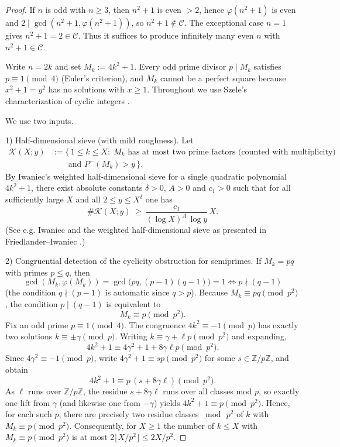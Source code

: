\documentclass[12pt]{article}
\theoremstyle{remark}
\begin{document}
\begin{proof}
If $n$ is odd with $n\ge 3$, then $n^2+1$ is even $>2$, hence $\varphi(n^2+1)$ is even and $2\mid\gcd(n^2+1,\varphi(n^2+1))$, so $n^2+1\notin\mathcal C$. The exceptional case $n=1$ gives $n^2+1=2\in\mathcal C$. Thus it suffices to produce infinitely many even $n$ with $n^2+1\in\mathcal C$.

Write $n=2k$ and set $M_k:=4k^2+1$. Every odd prime divisor $p\mid M_k$ satisfies $p\equiv1\pmod4$ (Euler's criterion), and $M_k$ cannot be a perfect square because $x^2+1=y^2$ has no solutions with $x\ge1$. Throughout we use Szele's characterization of cyclic integers \cite{Szele1947}.

We use two inputs.

1) Half-dimensional sieve (with mild roughness). Let
\[
\begin{aligned}
\mathcal K(X;y)
 &:= \{\,1\le k\le X:\; M_k \text{ has at most two prime factors (counted with multiplicity)}\\
 &\qquad \text{and } P^-(M_k)>y\,\}.
\end{aligned}
\]
By Iwaniec's weighted half-dimensional sieve for a single quadratic polynomial $4k^2+1$, there exist absolute constants $\delta>0$, $A>0$ and $c_1>0$ such that for all sufficiently large $X$ and all $2\le y\le X^{\delta}$ one has
$$
\#\mathcal K(X;y)\ \ge\ \frac{c_1}{(\log X)^{A}\,\log y}\,X.
$$ (See e.g. Iwaniec \cite{Iwaniec1978} and the weighted half-dimensional sieve as presented in Friedlander--Iwaniec \cite{FI2010}.)

2) Congruential detection of the cyclicity obstruction for semiprimes. If $M_k=pq$ with primes $p\le q$, then
$$
\gcd(M_k,\varphi(M_k))=\gcd\bigl(pq,(p-1)(q-1)\bigr)=1
\iff p\nmid(q-1)
$$ (the condition $q\nmid(p-1)$ is automatic since $q>p$). Because $M_k\equiv pq\pmod{p^2}$, the condition $p\mid(q-1)$ is equivalent to
$$
M_k\equiv p\pmod{p^2}.
$$
Fix an odd prime $p\equiv1\pmod4$. The congruence $4k^2\equiv-1\pmod p$ has exactly two solutions $k\equiv\pm\gamma\pmod p$. Writing $k\equiv\gamma+\ell p\pmod{p^2}$ and expanding,
$$
4k^2+1\equiv 4\gamma^2+1+8\gamma\ell p\pmod{p^2}.
$$
Since $4\gamma^2\equiv-1\pmod p$, write $4\gamma^2+1\equiv sp\pmod{p^2}$ for some $s\in\mathbb Z/p\mathbb Z$, and obtain
$$
4k^2+1\equiv p\,(s+8\gamma\ell)\pmod{p^2}.
$$
As $\ell$ runs over $\mathbb Z/p\mathbb Z$, the residue $s+8\gamma\ell$ runs over all classes mod $p$, so exactly one lift from $\gamma$ (and likewise one from $-\gamma$) yields $4k^2+1\equiv p\pmod{p^2}$. Hence, for each such $p$, there are precisely two residue classes $\bmod\,p^2$ of $k$ with $M_k\equiv p\pmod{p^2}$. Consequently, for $X\ge1$ the number of $k\le X$ with $M_k\equiv p\pmod{p^2}$ is at most $2\lfloor X/p^2\rfloor\le 2X/p^2$.


\end{proof}
\end{document}
